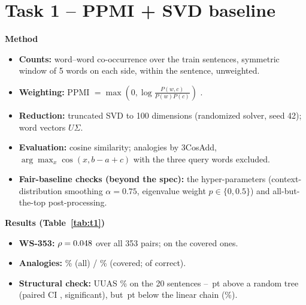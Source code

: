 \documentclass[11pt,a4paper]{article}
\newcommand{\pt}{\,pt}
\newcommand{\blk}[1]{\par\needspace{5\baselineskip}\smallskip\noindent\textbf{#1}\par\nobreak\vspace{1pt}}
\begin{document}
\section{Task 1 -- PPMI + SVD baseline}\label{sec:t1}
\blk{Method}
\begin{itemize}
\item \textbf{Counts:} word--word co-occurrence over the train sentences, symmetric window of 5 words on each side, within the
sentence, unweighted.
\item \textbf{Weighting:} PPMI $=\max(0,\log\frac{P(w,c)}{P(w)P(c)})$ \citep{levy2014}.
\item \textbf{Reduction:} truncated SVD to 100 dimensions (randomized solver, seed 42); word vectors $U\Sigma$.
\item \textbf{Evaluation:} cosine similarity; analogies by 3CosAdd, $\arg\max_x \cos(x, b-a+c)$ with the three query words excluded.
\item \textbf{Fair-baseline checks (beyond the spec):} the \citet{levy2015} hyper-parameters (context-distribution smoothing
$\alpha=0.75$, eigenvalue weight $p\in\{0,0.5\}$) and all-but-the-top post-processing.
\end{itemize}

\begin{table}[h]\centering\footnotesize\setlength{\tabcolsep}{4pt}
\caption{Task 1 results. ``covered'' = items whose words are all in the vocabulary; ``all'' = all items (spec-literal).
``freq.\,$\ge$20'' = the 32 covered pairs whose two words occur $\ge$20 times in train. Pool = all 660 eligible test sentences.}
\label{tab:t1}\end{table}

\blk{Results (Table~\ref{tab:t1})}
\begin{itemize}
\item \textbf{WS-353:} $\rho=0.048$ over all 353 pairs; \TOneWSCov{} \TOneWSCI{} on the covered ones.
\item \textbf{Analogies:} \TOneANFull\% (all) / \TOneANCov\% (covered; \TOneANCorrect{} of \ANCovered{} correct).
\item \textbf{Structural check:} UUAS \TOneMST\% \TOneMSTCI{} on the 20 sentences --
\TOneVsRandom\pt{} above a random tree (paired CI \TOneVsRandomCI, significant), but \TOneVsChain\pt{} below the linear chain (\ChainMST\%).
\end{itemize}
\end{document}
